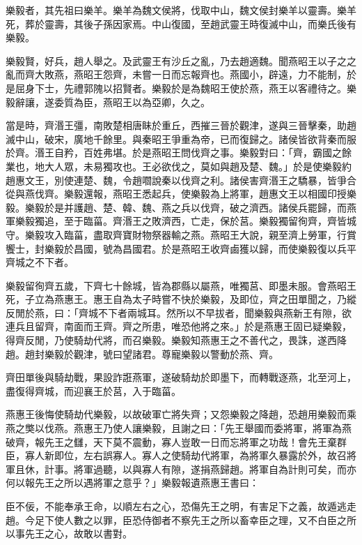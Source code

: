 
\begin{pinyinscope}
樂毅者，其先祖曰樂羊。樂羊為魏文侯將，伐取中山，魏文侯封樂羊以靈壽。樂羊死，葬於靈壽，其後子孫因家焉。中山復國，至趙武靈王時復滅中山，而樂氏後有樂毅。

樂毅賢，好兵，趙人舉之。及武靈王有沙丘之亂，乃去趙適魏。聞燕昭王以子之之亂而齊大敗燕，燕昭王怨齊，未嘗一日而忘報齊也。燕國小，辟遠，力不能制，於是屈身下士，先禮郭隗以招賢者。樂毅於是為魏昭王使於燕，燕王以客禮待之。樂毅辭讓，遂委質為臣，燕昭王以為亞卿，久之。

當是時，齊湣王彊，南敗楚相唐眛於重丘，西摧三晉於觀津，遂與三晉擊秦，助趙滅中山，破宋，廣地千餘里。與秦昭王爭重為帝，已而復歸之。諸侯皆欲背秦而服於齊。湣王自矜，百姓弗堪。於是燕昭王問伐齊之事。樂毅對曰：「齊，霸國之餘業也，地大人眾，未易獨攻也。王必欲伐之，莫如與趙及楚、魏。」於是使樂毅約趙惠文王，別使連楚、魏，令趙嚪說秦以伐齊之利。諸侯害齊湣王之驕暴，皆爭合從與燕伐齊。樂毅還報，燕昭王悉起兵，使樂毅為上將軍，趙惠文王以相國印授樂毅。樂毅於是并護趙、楚、韓、魏、燕之兵以伐齊，破之濟西。諸侯兵罷歸，而燕軍樂毅獨追，至于臨菑。齊湣王之敗濟西，亡走，保於莒。樂毅獨留徇齊，齊皆城守。樂毅攻入臨菑，盡取齊寶財物祭器輸之燕。燕昭王大說，親至濟上勞軍，行賞饗士，封樂毅於昌國，號為昌國君。於是燕昭王收齊鹵獲以歸，而使樂毅復以兵平齊城之不下者。

樂毅留徇齊五歲，下齊七十餘城，皆為郡縣以屬燕，唯獨莒、即墨未服。會燕昭王死，子立為燕惠王。惠王自為太子時嘗不快於樂毅，及即位，齊之田單聞之，乃縱反閒於燕，曰：「齊城不下者兩城耳。然所以不早拔者，聞樂毅與燕新王有隙，欲連兵且留齊，南面而王齊。齊之所患，唯恐他將之來。」於是燕惠王固已疑樂毅，得齊反閒，乃使騎劫代將，而召樂毅。樂毅知燕惠王之不善代之，畏誅，遂西降趙。趙封樂毅於觀津，號曰望諸君。尊寵樂毅以警動於燕、齊。

齊田單後與騎劫戰，果設詐誑燕軍，遂破騎劫於即墨下，而轉戰逐燕，北至河上，盡復得齊城，而迎襄王於莒，入于臨菑。

燕惠王後悔使騎劫代樂毅，以故破軍亡將失齊；又怨樂毅之降趙，恐趙用樂毅而乘燕之獘以伐燕。燕惠王乃使人讓樂毅，且謝之曰：「先王舉國而委將軍，將軍為燕破齊，報先王之讎，天下莫不震動，寡人豈敢一日而忘將軍之功哉！會先王棄群臣，寡人新即位，左右誤寡人。寡人之使騎劫代將軍，為將軍久暴露於外，故召將軍且休，計事。將軍過聽，以與寡人有隙，遂捐燕歸趙。將軍自為計則可矣，而亦何以報先王之所以遇將軍之意乎？」樂毅報遺燕惠王書曰：

臣不佞，不能奉承王命，以順左右之心，恐傷先王之明，有害足下之義，故遁逃走趙。今足下使人數之以罪，臣恐侍御者不察先王之所以畜幸臣之理，又不白臣之所以事先王之心，故敢以書對。


\end{pinyinscope}
